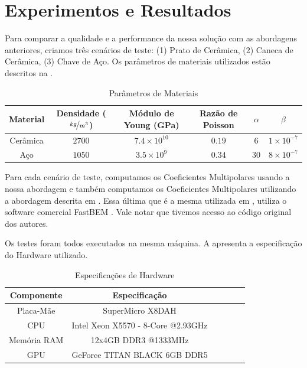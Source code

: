 \chapter{Experimentos e Resultados}

Para comparar a qualidade e a performance da nossa solução com as abordagens anteriores, criamos três cenários de teste: (1) Prato de Cerâmica, (2) Caneca de Cerâmica, (3) Chave de Aço. Os parâmetros de materiais utilizados estão descritos na .

\begin{table}[ht]
\begin{center}
\begin{tabular}{c|ccccc}
Material & Densidade ($\nicefrac{kg}{m^3}$) & Módulo de Young (GPa) & Razão de Poisson & $\alpha$ & $\beta$\\
\hline Cerâmica & $2700$ & $7.4 \times 10^{10}$ & $0.19$ & $6$ & $1 \times 10^{-7}$\\
Aço & $1050$ & $3.5 \times 10^9$ & $0.34$ & $30$ & $8 \times 10^{-7}$\\
\end{tabular}
\end{center}
\caption{Parâmetros de Materiais}\label{tab:material_parameters}
\end{table}

Para cada cenário de teste, computamos os Coeficientes Multipolares usando a nossa abordagem e também computamos os Coeficientes Multipolares utilizando a abordagem descrita em \cite{zheng2010rigid}. Essa última que é a mesma utilizada em \cite{zheng2010rigid, zheng2011toward, langlois2014eigenmode}, utiliza o software comercial FastBEM \cite{fastbem}. Vale notar que tivemos acesso ao código original dos autores.

Os testes foram todos executados na mesma máquina. A  apresenta a especificação do Hardware utilizado.

\begin{table}[ht]
\begin{center}
\begin{tabular}{c|ccccc}
Componente & Especificação\\
\hline 
Placa-Mãe & SuperMicro X8DAH\\
CPU & Intel Xeon X5570 - 8-Core @2.93GHz\\
Memória RAM & 12x4GB DDR3 @1333MHz\\
GPU & GeForce TITAN BLACK 6GB DDR5
\end{tabular}
\end{center}
\caption{Especificações de Hardware}\label{tab:benchmark_hardware}
\end{table}

